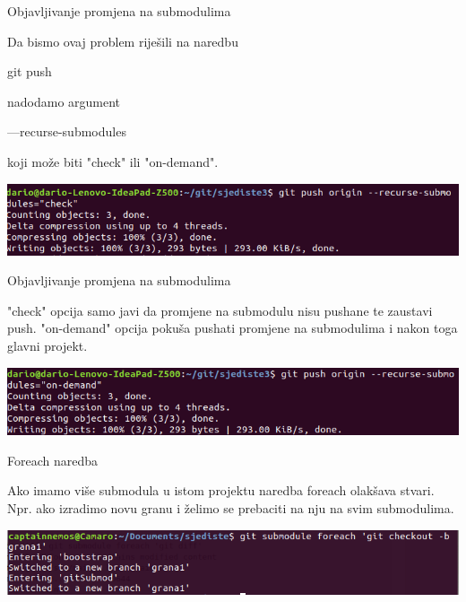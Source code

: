 \documentclass[10pt]{beamer}
\begin{document}
\begin{frame}[fragile]{Objavljivanje promjena na submodulima}
    
    Da bismo ovaj problem riješili na naredbu
    \begin{semiverbatim}git push\end{semiverbatim}
    nadodamo argument \begin{semiverbatim}---recurse-submodules\end{semiverbatim}
    koji može biti "check" ili "on-demand".
    
    \includegraphics[scale=0.4]{sub_check}
\end{frame}

\begin{frame}[fragile]{Objavljivanje promjena na submodulima}
    
    "check" opcija samo javi da promjene na submodulu nisu pushane te zaustavi push.
    "on-demand" opcija pokuša pushati promjene na submodulima i nakon toga glavni projekt.

    \includegraphics[scale=0.4]{sub_ondemand}
    
\end{frame}

\begin{frame}[fragile]{Foreach naredba}
    
    Ako imamo više submodula u istom projektu naredba foreach olakšava stvari.
	Npr. ako izradimo novu granu i želimo se prebaciti na nju na svim submodulima.
	
    \includegraphics[scale=0.4]{sub_foreach}
\end{frame}
\end{document}
